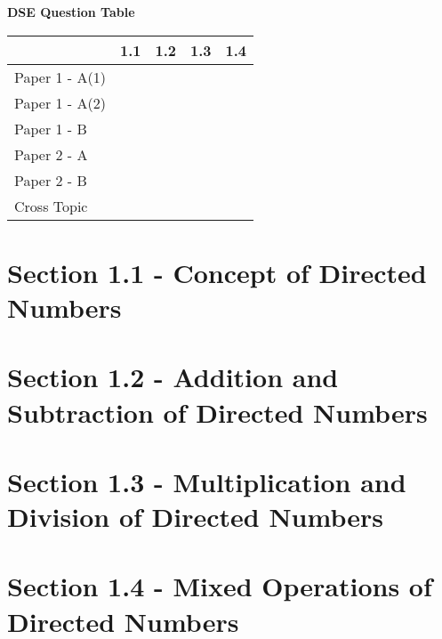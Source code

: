 \documentclass[12pt, a4paper]{article}
\begin{document}
\begin{absolutelynopagebreak}
\begin{center}
\textbf{DSE Question Table}
\end{center}
\begin{center}
\begin{tabular}{|l|c|c|c|c|}
\hline
        & 1.1 & 1.2 & 1.3 & 1.4 \\\hline
\hline
Paper 1 - A(1)&  &  &  &  \\
\hline
Paper 1 - A(2)&  &  &  &  \\
\hline
Paper 1 - B&  &  &  &  \\
\hline
\hline
Paper 2 - A&  &  &  &  \\
\hline
Paper 2 - B&  &  &  &  \\
\hline
\hline
Cross Topic&  &  &  &  \\
\hline
\end{tabular}
\end{center}
\end{absolutelynopagebreak}




\section*{Section 1.1 - Concept of Directed Numbers}\label{section:1-1-1}





\section*{Section 1.2 - Addition and Subtraction of Directed Numbers}\label{section:1-1-2}





\section*{Section 1.3 - Multiplication and Division of Directed Numbers}\label{section:1-1-3}





\section*{Section 1.4 - Mixed Operations of Directed Numbers}\label{section:1-1-4}
\end{document}
